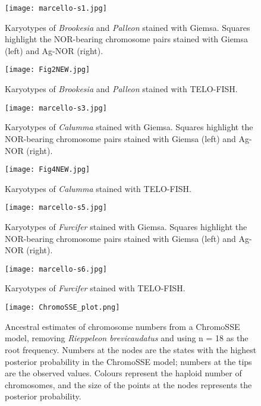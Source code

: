 \documentclass[a4paper, 12pt]{article}
\begin{document}
\newpage
\begin{figure}[h]
 \centering
  \texttt{[image: marcello-s1.jpg]}
  \caption{Karyotypes of \textit{Brookesia} and \textit{Palleon} stained with Giemsa. Squares highlight the NOR-bearing chromosome pairs stained with Giemsa (left) and Ag-NOR (right).
}
  \label{fig-s1}
\end{figure}

\newpage
\begin{figure}[h]
 \centering
  \texttt{[image: Fig2NEW.jpg]}
  \caption{Karyotypes of \textit{Brookesia} and \textit{Palleon} stained with TELO-FISH.
}
  \label{fig-s2}
\end{figure}

\newpage
\begin{figure}[h]
 \centering
  \texttt{[image: marcello-s3.jpg]}
  \caption{Karyotypes of \textit{Calumma} stained with Giemsa. Squares highlight the NOR-bearing chromosome pairs stained with Giemsa (left) and Ag-NOR (right).
}
  \label{fig-s3}
\end{figure}

\newpage
\begin{figure}[h]
 \centering
  \texttt{[image: Fig4NEW.jpg]}
  \caption{Karyotypes of \textit{Calumma} stained with TELO-FISH.
}
  \label{fig-s4}
\end{figure}

\newpage
\begin{figure}[h]
 \centering
  \texttt{[image: marcello-s5.jpg]}
  \caption{Karyotypes of \textit{Furcifer} stained with Giemsa. Squares highlight the NOR-bearing chromosome pairs stained with Giemsa (left) and Ag-NOR (right).
}
  \label{fig-s5}
\end{figure}

\newpage
\begin{figure}[h]
 \centering
  \texttt{[image: marcello-s6.jpg]}
  \caption{Karyotypes of \textit{Furcifer} stained with TELO-FISH.
}
  \label{fig-s6}
\end{figure}

\newpage
\begin{figure}[h]
 \centering
  \texttt{[image: ChromoSSE\_plot.png]}
  \caption{Ancestral estimates of chromosome numbers from a ChromoSSE model, removing \textit{Rieppeleon brevicaudatus} and using n = 18 as the root frequency. Numbers at the nodes are the states with the highest posterior probability in the ChromoSSE model; numbers at the tips are the observed values. Colours represent the haploid number of chromosomes, and the size of the points at the nodes represents the posterior probability.
}
  \label{fig-best}
\end{figure}
\end{document}
